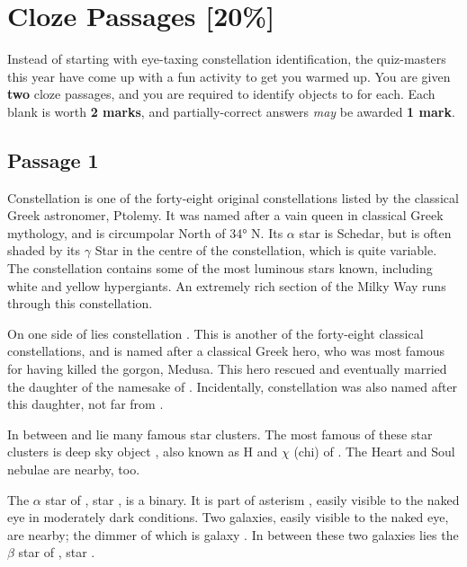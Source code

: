\documentclass[a4paper,11pt]{exam}
\begin{document}
\section{Cloze Passages \hfill [20\%]}
Instead of starting with eye-taxing constellation identification, the quiz-masters this year have come up with a fun activity to get you warmed up. You are given \textbf{two} cloze passages, and you are required to identify objects  to  for each. Each blank is worth \textbf{2 marks}, and partially-correct answers \textit{may} be awarded \textbf{1 mark}.

{}

\subsection*{Passage 1} 
Constellation  is one of the forty-eight original constellations listed by the classical Greek astronomer, Ptolemy. It was named after a vain queen in classical Greek mythology, and is circumpolar North of \ang{34} N. Its  $\alpha$  star is Schedar, but is often shaded by its $ \gamma $ Star in the centre of the constellation, which is quite variable. The constellation contains some of the most luminous stars known, including white and yellow hypergiants. An extremely rich section of the Milky Way runs through this constellation. 

On one side of  lies constellation . This is another of the forty-eight classical constellations, and is named after a classical Greek hero, who was most famous for having killed the gorgon, Medusa. This hero rescued and eventually married the daughter of the namesake of . Incidentally, constellation  was also named after this daughter, not far from .

In between  and  lie many famous star clusters. The most famous of these star clusters is deep sky object , also known as H and $ \chi $ (chi) of . The Heart and Soul nebulae are nearby, too.

The $ \alpha $ star of , star , is a binary. It is part of asterism , easily visible to the naked eye in moderately dark conditions. Two galaxies, easily visible to the naked eye, are nearby; the dimmer of which is galaxy .  In  between these two galaxies lies the $ \beta $ star of , star .
\end{document}
